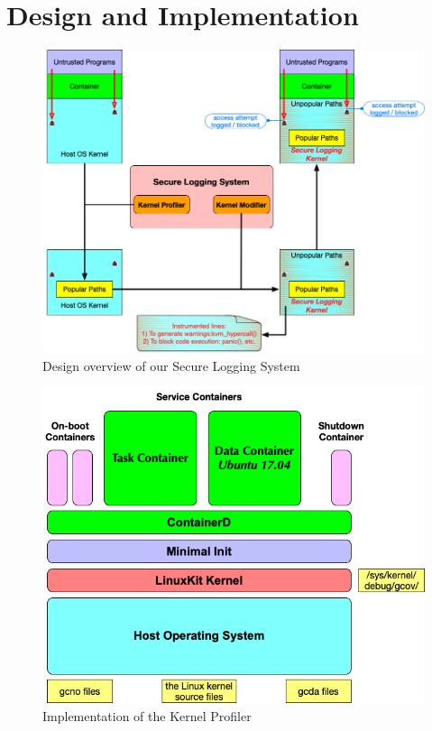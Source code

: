 \section{Design and Implementation}
\label{sec.design}

\begin{figure}
\centering
\includegraphics[width=1.5\columnwidth]{diagram/design.png}
\caption{\small Design overview of our Secure Logging System}
\label{fig:design}
\end{figure}

\begin{figure}
\centering
\includegraphics[width=1.5\columnwidth]{diagram/linuxkit-kernel-profiler.png}
\caption{\small Implementation of the Kernel Profiler}
\label{fig:linuxkit-kernel-profiler}
\end{figure}

